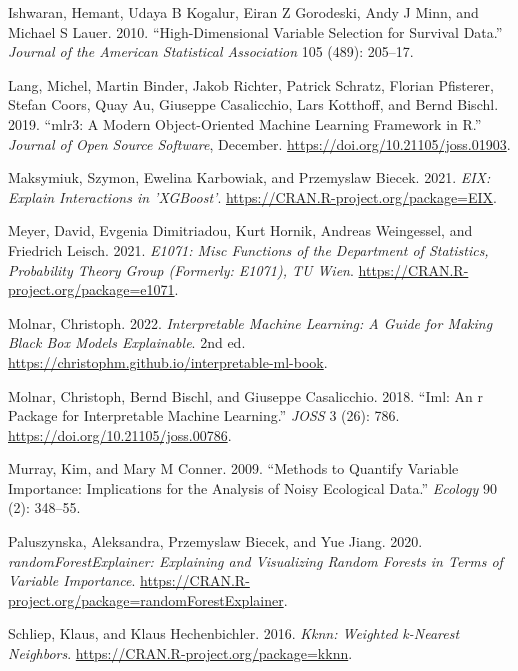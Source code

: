\begin{CSLReferences}{1}{0}
\leavevmode{}%
Ishwaran, Hemant, Udaya B Kogalur, Eiran Z Gorodeski, Andy J Minn, and Michael S Lauer. 2010. {``High-Dimensional Variable Selection for Survival Data.''} \emph{Journal of the American Statistical Association} 105 (489): 205--17.

\leavevmode{}%
Lang, Michel, Martin Binder, Jakob Richter, Patrick Schratz, Florian Pfisterer, Stefan Coors, Quay Au, Giuseppe Casalicchio, Lars Kotthoff, and Bernd Bischl. 2019. {``{mlr3}: A Modern Object-Oriented Machine Learning Framework in {R}.''} \emph{Journal of Open Source Software}, December. \url{https://doi.org/10.21105/joss.01903}.

\leavevmode{}%
Maksymiuk, Szymon, Ewelina Karbowiak, and Przemyslaw Biecek. 2021. \emph{EIX: Explain Interactions in 'XGBoost'}. \url{https://CRAN.R-project.org/package=EIX}.

\leavevmode{}%
Meyer, David, Evgenia Dimitriadou, Kurt Hornik, Andreas Weingessel, and Friedrich Leisch. 2021. \emph{E1071: Misc Functions of the Department of Statistics, Probability Theory Group (Formerly: E1071), TU Wien}. \url{https://CRAN.R-project.org/package=e1071}.

\leavevmode{}%
Molnar, Christoph. 2022. \emph{Interpretable Machine Learning: A Guide for Making Black Box Models Explainable}. 2nd ed. \url{https://christophm.github.io/interpretable-ml-book}.

\leavevmode{}%
Molnar, Christoph, Bernd Bischl, and Giuseppe Casalicchio. 2018. {``Iml: An r Package for Interpretable Machine Learning.''} \emph{JOSS} 3 (26): 786. \url{https://doi.org/10.21105/joss.00786}.

\leavevmode{}%
Murray, Kim, and Mary M Conner. 2009. {``Methods to Quantify Variable Importance: Implications for the Analysis of Noisy Ecological Data.''} \emph{Ecology} 90 (2): 348--55.

\leavevmode{}%
Paluszynska, Aleksandra, Przemyslaw Biecek, and Yue Jiang. 2020. \emph{randomForestExplainer: Explaining and Visualizing Random Forests in Terms of Variable Importance}. \url{https://CRAN.R-project.org/package=randomForestExplainer}.

\leavevmode{}%
Schliep, Klaus, and Klaus Hechenbichler. 2016. \emph{Kknn: Weighted k-Nearest Neighbors}. \url{https://CRAN.R-project.org/package=kknn}.


\end{CSLReferences}
